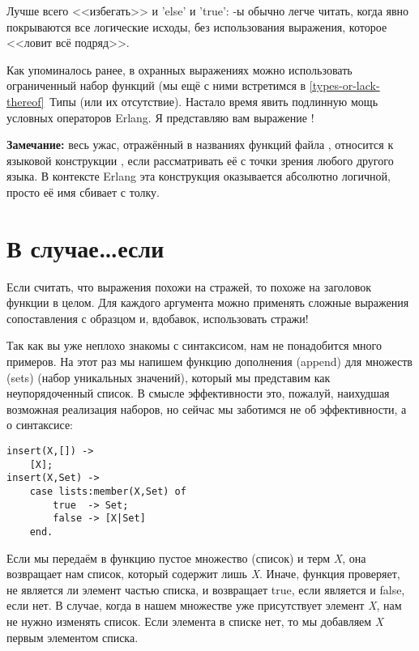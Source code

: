 Лучше всего <<избегать>> и 'else' и 'true': \--ы обычно легче читать, когда явно покрываются все логические исходы, без использования выражения, которое <<ловит всё подряд>>.

Как упоминалось ранее, в охранных выражениях можно использовать ограниченный набор функций (мы ещё с ними встретимся в \ref{types-or-lack-thereof}~Типы (или их отсутствие).
Настало время явить подлинную мощь условных операторов Erlang.
Я представляю вам выражение !\\
\colorbox{lgray}
{
    \begin{minipage}{\linewidth}
\textbf{Замечание:} весь ужас, отражённый в названиях функций файла , относится к языковой конструкции , если рассматривать её с точки зрения  любого другого языка.
В контексте Erlang эта конструкция оказывается абсолютно логичной, просто её имя сбивает с толку.
    \end{minipage}
}
\section{В случае\ldots если}

Если считать, что выражения  похожи на стражей, то  похоже на заголовок функции в целом.
Для каждого аргумента можно применять сложные выражения сопоставления с образцом и, вдобавок, использовать стражи!

Так как вы уже неплохо знакомы с синтаксисом, нам не понадобится много примеров.
На этот раз мы напишем функцию дополнения (append) для множеств (sets) (набор уникальных значений), который мы представим как неупорядоченный список.
В смысле эффективности это, пожалуй, наихудшая возможная реализация наборов, но сейчас мы заботимся не об эффективности, а о синтаксисе:
\begin{lstlisting}[style=erlang]
insert(X,[]) ->
    [X];
insert(X,Set) ->
    case lists:member(X,Set) of
        true  -> Set;
        false -> [X|Set]
    end.
\end{lstlisting}
Если мы передаём в функцию пустое множество (список) и терм \emph{X}, она возвращает нам список, который содержит лишь \emph{X}.
Иначе, функция  проверяет, не является ли элемент частью списка, и возвращает true, если является и false, если нет.
В случае, когда в нашем множестве уже присутствует элемент \emph{X}, нам не нужно изменять список.
Если элемента в списке нет, то мы добавляем \emph{X} первым элементом списка.

